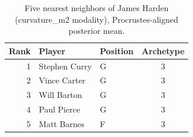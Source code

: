 \begin{table}[htbp]
  \centering\small
  \begin{tabular}{rllc}
    \toprule
    Rank & Player & Position & Archetype \\
    \midrule
    1 & Stephen Curry & G & 3 \\
    2 & Vince Carter & G & 3 \\
    3 & Will Barton & G & 3 \\
    4 & Paul Pierce & G & 3 \\
    5 & Matt Barnes & F & 3 \\
    \bottomrule
  \end{tabular}
  \caption{Five nearest neighbors of James Harden (curvature_m2 modality), Procrustes-aligned posterior mean.}
  \label{tab:James_Harden_neighbors_curvature_m2}
\end{table}

